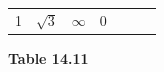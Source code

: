 {\begin{center}
\begin{xtabular*}{\mytablewidth}[t]{|p{10\mystarwidth}|p{10\mystarwidth}|p{10\mystarwidth}|p{10\mystarwidth}|p{10\mystarwidth}|p{10\mystarwidth}|p{10\mystarwidth}|}
    
        1 &
    
    
        
                  \begin{math}\sqrt{3}\end{math}
                 &
    
    
        
                  \begin{math}\infty \end{math}
                 &
    
    
        0%
     \tabularnewline{}
    \end{xtabular*}
      \end{center}
    \begin{center}{\small\bfseries Table 14.11}\end{center}
    
    \addtocounter{footnote}{-0}
    
        }%
      
    \par
  

